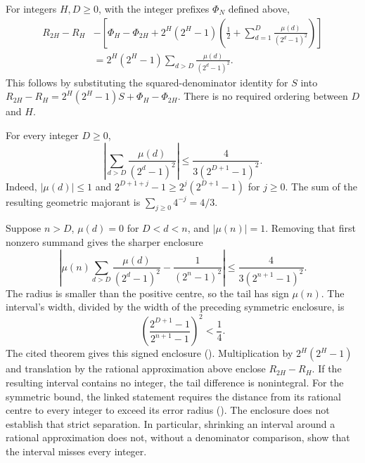 \begin{prop}\label{prop:exact-rational-approximation-formula}
For integers $H,D\ge0$, with the integer prefixes $\Phi_N$ defined above,
\[
\begin{aligned}
 R_{2H}-R_H
 &-\left[\Phi_H-\Phi_{2H}
   +2^H(2^H-1)\left(\frac12+\sum_{d=1}^{D}\frac{\mu(d)}{(2^d-1)^2}\right)\right]\\
 &=2^H(2^H-1)\sum_{d>D}\frac{\mu(d)}{(2^d-1)^2}.
\end{aligned}
\]
This follows by substituting the squared-denominator identity for $S$
into $R_{2H}-R_H=2^H(2^H-1)S+\Phi_H-\Phi_{2H}$. There is no required
ordering between $D$ and $H$.
\end{prop}

\begin{prop}\label{prop:geometric-tail-bound}
For every integer $D\ge0$,
\[
 \left|\sum_{d>D}\frac{\mu(d)}{(2^d-1)^2}\right|
 \le \frac{4}{3(2^{D+1}-1)^2}.
\]
Indeed, $|\mu(d)|\le1$ and
$2^{D+1+j}-1\ge2^j(2^{D+1}-1)$ for $j\ge0$. The sum of the resulting
geometric majorant is $\sum_{j\ge0}4^{-j}=4/3$.
\end{prop}

\begin{obs}
Suppose $n>D$, $\mu(d)=0$ for $D<d<n$, and $|\mu(n)|=1$. Removing
that first nonzero summand gives the sharper enclosure
\[
 \left|\mu(n)\sum_{d>D}\frac{\mu(d)}{(2^d-1)^2}
                 -\frac1{(2^n-1)^2}\right|
       \le\frac4{3(2^{n+1}-1)^2}.
\]
The radius is smaller than the positive centre, so the tail has sign
$\mu(n)$. The interval's width, divided by the width of the preceding
symmetric enclosure, is
\[
 \left(\frac{2^{D+1}-1}{2^{n+1}-1}\right)^2<\frac14.
\]
The cited theorem gives this signed enclosure
().
Multiplication by $2^H(2^H-1)$ and translation by the rational
approximation above enclose $R_{2H}-R_H$. If the resulting interval
contains no integer, the tail difference is nonintegral. For the symmetric
bound, the linked statement requires the distance from its rational centre
to every integer to exceed its error radius
().
The enclosure does not establish that strict separation. In particular,
shrinking an interval around a rational approximation does not, without a
denominator comparison, show that the interval misses every integer.
\end{obs}

